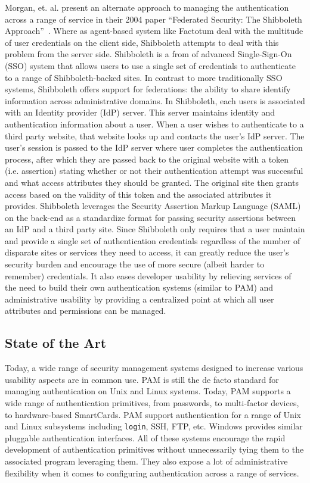 \documentclass{sig-alternate}
\begin{document}
Morgan, et. al. present an alternate approach to managing the
authentication across a range of service in their 2004 paper
``Federated Security: The Shibboleth Approach''~\cite{Morgan2004}.
Where as agent-based system like Factotum deal with the multitude of
user credentials on the client side, Shibboleth attempts to deal with
this problem from the server side. Shibboleth is a from of advanced
Single-Sign-On (SSO) system that allows users to use a single set of
credentials to authenticate to a range of Shibboleth-backed sites. In
contrast to more traditionally SSO systems, Shibboleth offers support
for federations: the ability to share identify information across
administrative domains. In Shibboleth, each users is associated with
an Identity provider (IdP) server. This server maintains identity and
authentication information about a user. When a user wishes to
authenticate to a third party website, that website looks up and
contacts the user's IdP server. The user's session is passed to the
IdP server where user completes the authentication process, after
which they are passed back to the original website with a token
(i.e. assertion) stating whether or not their authentication attempt
was successful and what access attributes they should be granted. The
original site then grants access based on the validity of this token
and the associated attributes it provides. Shibboleth leverages the
Security Assertion Markup Language (SAML) on the back-end as a
standardize format for passing security assertions between an IdP and
a third party site. Since Shibboleth only requires that a user
maintain and provide a single set of authentication credentials
regardless of the number of disparate sites or services they need to
access, it can greatly reduce the user's security burden and encourage
the use of more secure (albeit harder to remember) credentials. It
also eases developer usability by relieving services of the need to
build their own authentication systems (similar to PAM) and
administrative usability by providing a centralized point at which all
user attributes and permissions can be managed.

\subsection{State of the Art}

Today, a wide range of security management systems designed to
increase various usability aspects are in common use. PAM is still the
de facto standard for managing authentication on Unix and Linux
systems. Today, PAM supports a wide range of authentication
primitives, from passwords, to multi-factor devices, to hardware-based
SmartCards. PAM support authentication for a range of Unix and Linux
subsystems including \texttt{login}, SSH, FTP, etc. Windows provides
similar pluggable authentication interfaces. All of these systems
encourage the rapid development of authentication primitives without
unnecessarily tying them to the associated program leveraging
them. They also expose a lot of administrative flexibility when it
comes to configuring authentication across a range of services.
\end{document}
